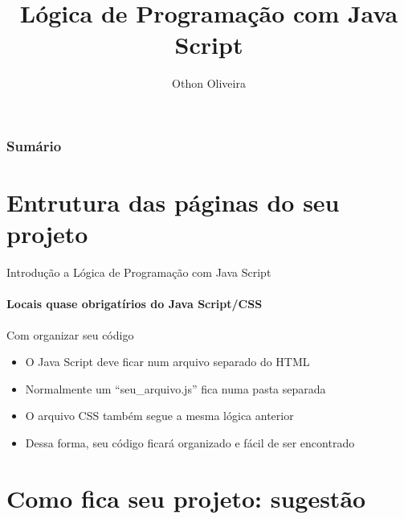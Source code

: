 \documentclass[13pt, xcolor={dvipsnames,svgnames}, portuguese]{beamer}
\author{Othon Oliveira}
\title{Lógica de Programação com Java Script}
\institute{SENAC - PROA}
\date{}
\begin{document}
\begin{frame}
\titlepage
\end{frame}

\newcommand{\capa}{
    \begin{tikzpicture}[remember picture,overlay]
        \node at (current page.south west)
            {\begin{tikzpicture}[remember picture, overlay]
                \fill[shading=radial,top color=orange,bottom color=orange,middle color=yellow] (0,0) rectangle (\paperwidth,\paperheight);
            \end{tikzpicture}
          };
    \end{tikzpicture}
}

\begin{frame}\frametitle{Sumário}
\tableofcontents
\end{frame}


\section{Entrutura das páginas do seu projeto}
\begin{frame}{Introdução a Lógica de Programação com Java Script}
\framesubtitle{ Locais quase obrigatírios do Java Script/CSS}
	\begin{block}{Com organizar seu código}
		\begin{itemize}
		  \item[a.] O Java Script deve ficar num arquivo separado do HTML
		  \pause
		  \item[b.] Normalmente um ``seu\_arquivo.js'' fica numa pasta separada
		   \pause		  
		  \item[c.] O arquivo CSS também segue a mesma lógica anterior
		  \pause
		  \item[d.] Dessa forma, seu código ficará organizado e fácil de ser encontrado
		\end{itemize}
	\end{block} 
\end{frame}

\section{Como fica seu projeto: sugestão}
\end{document}
